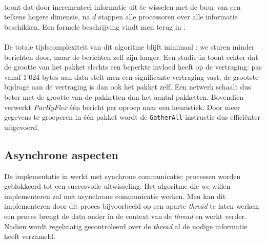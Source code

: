 \paragraph{}
 toont dat door incrementeel informatie uit te wisselen met de buur van een telkens hogere dimensie, na $d$ stappen alle processoren over alle informatie beschikken. Een formele beschrijving vindt men terug in .


\paragraph{}
De totale tijdscomplexiteit van dit algoritme blijft minimaal : we sturen minder berichten door, maar de berichten zelf zijn langer. Een studie in \cite{journals/tjs/TaboadaTD12} toont echter dat de grootte van het pakket slechts een beperkte invloed heeft op de vertraging: pas vanaf 1'024 bytes aan data stelt men een significante vertraging vast, de grootste bijdrage aan de vertraging is dan ook het pakket zelf. Een netwerk schaalt dus beter met de grootte van de pakketten dan het aantal pakketten. Bovendien verwerkt \emph{ParHyFlex} \'e\'en bericht per oproep naar een heuristiek. Door meer gegevens te groeperen in \'e\'en pakket wordt de \texttt{GatherAll}-instructie dus effici\"enter uitgevoerd.

\subsection{Asynchrone aspecten}

De implementatie in  werkt met synchrone communicatie: processen worden geblokkeerd tot een succesvolle uitwisseling. Het algoritme die we willen implementeren zal met asynchrone communicatie werken. Men kan dit implementeren door dit proces bijvoorbeeld op een aparte \emph{thread} te laten werken: een proces brengt de data onder in de context van de \emph{thread} en werkt verder. Nadien wordt regelmatig gecontroleerd over de \emph{thread} al de nodige informatie heeft verzameld.


